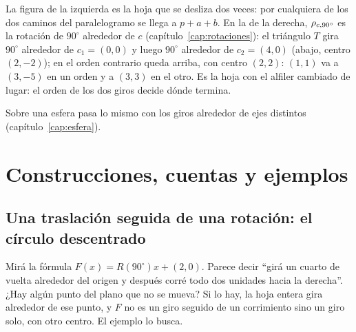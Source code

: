 La figura de la izquierda es la hoja que se desliza dos veces: por cualquiera de los dos
caminos del paralelogramo se llega a \(p+a+b\). En la de la derecha, \(\rho_{c,90^\circ}\) es la
rotación de \(90^\circ\) alrededor de \(c\) (capítulo~\ref{cap:rotaciones}): el triángulo \(T\) gira \(90^\circ\) alrededor de \(c_1=(0,0)\) y
luego \(90^\circ\) alrededor de \(c_2=(4,0)\) (abajo, centro \((2,-2)\)); en el orden contrario
queda arriba, con centro \((2,2)\): \((1,1)\) va a \((3,-5)\) en un orden y a \((3,3)\) en el otro.
Es la hoja con el alfiler cambiado de lugar: el orden de los dos giros decide dónde termina.

Sobre una esfera pasa lo mismo con los giros alrededor de ejes distintos
(capítulo~\ref{cap:esfera}).

\section{Construcciones, cuentas y ejemplos}

\subsection{Una traslación seguida de una rotación: el círculo descentrado}\label{sec:circulo-descentrado}

Mirá la fórmula \(F(x)=R(90^\circ)x+(2,0)\). Parece decir \enquote{girá un cuarto de vuelta
alrededor del origen y después corré todo dos unidades hacia la derecha}. ¿Hay algún punto del
plano que no se mueva? Si lo hay, la hoja entera gira alrededor de ese punto, y \(F\) no es un
giro seguido de un corrimiento sino un giro solo, con otro centro. El ejemplo lo busca.


